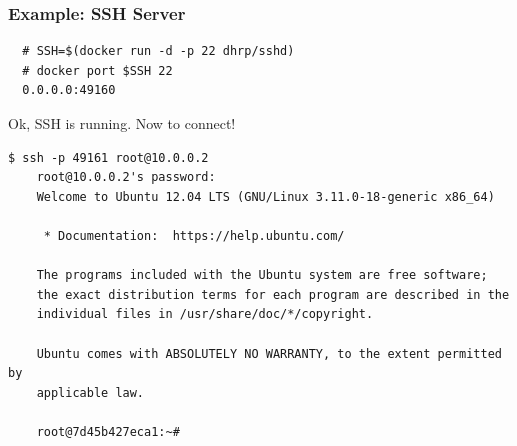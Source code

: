 \documentclass[xcolor=dvipsnames]{beamer}
\begin{document}
\begin{frame}[fragile]
  \frametitle{Example: SSH Server}
  \begin{lstlisting}
  # SSH=$(docker run -d -p 22 dhrp/sshd)
  # docker port $SSH 22
  0.0.0.0:49160
  \end{lstlisting}

  Ok, SSH is running. Now to connect!

\begin{lstlisting}[basicstyle=\tiny]
    $ ssh -p 49161 root@10.0.0.2
    root@10.0.0.2's password:
    Welcome to Ubuntu 12.04 LTS (GNU/Linux 3.11.0-18-generic x86_64)

     * Documentation:  https://help.ubuntu.com/

    The programs included with the Ubuntu system are free software;
    the exact distribution terms for each program are described in the
    individual files in /usr/share/doc/*/copyright.

    Ubuntu comes with ABSOLUTELY NO WARRANTY, to the extent permitted by
    applicable law.

    root@7d45b427eca1:~#
  \end{lstlisting}
  
\end{frame}
\end{document}
